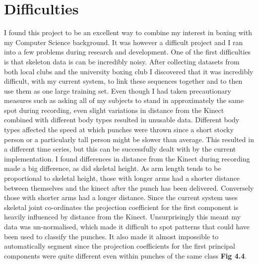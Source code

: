 \section{Difficulties}
I found this project to be an excellent way to combine my interest in boxing with my Computer Science background. It was however a difficult project and I ran into a few problems during research and development.
One of the first difficulties is that skeleton data is can be incredibly noisy. After collecting datasets from both local clubs and the university boxing club I discovered that it was incredibly difficult, with my current system, to link these sequences together and to then use them as one large training set. Even though I had taken precautionary measures such as asking all of my subjects to stand in approximately the same spot during recording, even slight variations in distance from the Kinect combined with different body types resulted in unusable data. 
Different body types affected the speed at which punches were thrown since a short stocky person or a particularly tall person might be slower than average. This resulted in a different time series, but this can be successfully dealt with by the current implementation.
I found differences in distance from the Kinect during recording made a big difference, as did skeletal height. As arm length tends to be proportional to skeletal height, those with longer arms had a shorter distance between themselves and the kinect after the punch has been delivered. Conversely those with shorter arms had a longer distance.
Since the current system uses skeletal joint co-ordinates the projection coefficient for the first component is heavily influenced by distance from the Kinect. Unsurprisingly this meant my data was un-normalised, which made it difficult to spot patterns that could have been used to classify the punches. It also made it almost impossible to automatically segment since the projection coefficients for the first principal components were quite different even within punches of the same class {\bf Fig 4.4}.

